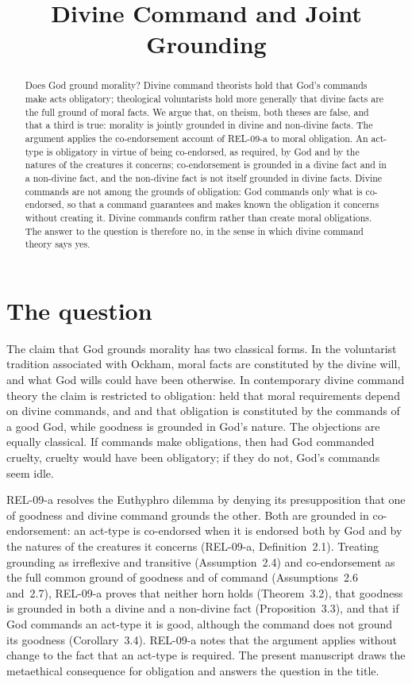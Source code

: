 \documentclass{situationist-preprint}
\title{Divine Command and Joint Grounding}
\begin{document}
\maketitle

\begin{abstract}
Does God ground morality? Divine command theorists hold that God's commands make acts obligatory; theological voluntarists hold more generally that divine facts are the full ground of moral facts. We argue that, on theism, both theses are false, and that a third is true: morality is jointly grounded in divine and non-divine facts. The argument applies the co-endorsement account of REL-09-a to moral obligation. An act-type is obligatory in virtue of being co-endorsed, as required, by God and by the natures of the creatures it concerns; co-endorsement is grounded in a divine fact and in a non-divine fact, and the non-divine fact is not itself grounded in divine facts. Divine commands are not among the grounds of obligation: God commands only what is co-endorsed, so that a command guarantees and makes known the obligation it concerns without creating it. Divine commands confirm rather than create moral obligations. The answer to the question is therefore no, in the sense in which divine command theory says yes.
\end{abstract}

\section{The question}

The claim that God grounds morality has two classical forms. In the voluntarist tradition associated with Ockham, moral facts are constituted by the divine will, and what God wills could have been otherwise. In contemporary divine command theory the claim is restricted to obligation: \citet{Quinn1978} held that moral requirements depend on divine commands, and \citet{Adams1999} and \citet{Evans2013} that obligation is constituted by the commands of a good God, while goodness is grounded in God's nature. The objections are equally classical. If commands make obligations, then had God commanded cruelty, cruelty would have been obligatory; if they do not, God's commands seem idle.

REL-09-a resolves the Euthyphro dilemma by denying its presupposition that one of goodness and divine command grounds the other. Both are grounded in co-endorsement: an act-type is co-endorsed when it is endorsed both by God and by the natures of the creatures it concerns (REL-09-a, Definition~2.1). Treating grounding as irreflexive and transitive (Assumption~2.4) and co-endorsement as the full common ground of goodness and of command (Assumptions~2.6 and~2.7), REL-09-a proves that neither horn holds (Theorem~3.2), that goodness is grounded in both a divine and a non-divine fact (Proposition~3.3), and that if God commands an act-type it is good, although the command does not ground its goodness (Corollary~3.4). REL-09-a notes that the argument applies without change to the fact that an act-type is required. The present manuscript draws the metaethical consequence for obligation and answers the question in the title.
\end{document}
